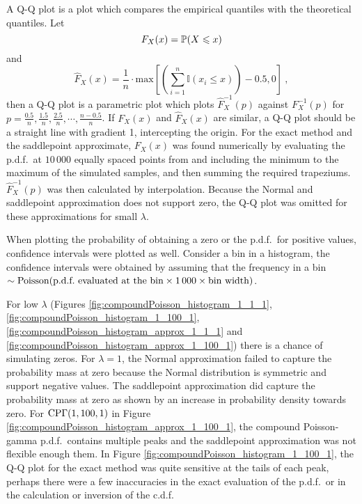 A Q-Q plot is a plot which compares the empirical quantiles with the theoretical quantiles. Let
\begin{equation}
  F_X(x) = \operatorname{\mathbb{P}}(X\leqslant x)
\end{equation}
and
\begin{equation}
  \widehat{F}_X(x) = \frac{1}{n}\cdot\text{max}
  \left[
    \left(\sum_{i=1}^n\mathbb{I}(x_i\leqslant x)\right)-0.5,0
  \right]
  \ ,
\end{equation}
then a Q-Q plot is a parametric plot which plots $\widehat{F}_X^{-1}(p)$ against $F_X^{-1}(p)$ for $p=\frac{0.5}{n},\frac{1.5}{n},\frac{2.5}{n},\cdots,\frac{n-0.5}{n}$. If $F_X(x)$ and $\widehat{F}_X(x)$ are similar, a Q-Q plot should be a straight line with gradient 1, intercepting the origin. For the exact method and the saddlepoint approximate, $F_X(x)$ was found numerically by evaluating the p.d.f.~at $10\,000$ equally spaced points from and including the minimum to the maximum of the simulated samples, and then summing the required trapeziums. $\widehat{F}_X^{-1}(p)$ was then calculated by interpolation. Because the Normal and saddlepoint approximation does not support zero, the Q-Q plot was omitted for these approximations for small $\lambda$.

When plotting the probability of obtaining a zero or the p.d.f.~for positive values, confidence intervals were plotted as well. Consider a bin in a histogram, the confidence intervals were obtained by assuming that the frequency in a bin $\sim\operatorname{Poisson}(\text{p.d.f.~evaluated at the bin}\times 1\,000 \times \text{bin width})$.

For low $\lambda$ (Figures \ref{fig:compoundPoisson_histogram_1_1_1}, \ref{fig:compoundPoisson_histogram_1_100_1}, \ref{fig:compoundPoisson_histogram_approx_1_1_1} and \ref{fig:compoundPoisson_histogram_approx_1_100_1}) there is a chance of simulating zeros. For $\lambda = 1$, the Normal approximation failed to capture the probability mass at zero because the Normal distribution is symmetric and support negative values. The saddlepoint approximation did capture the probability mass at zero as shown by an increase in probability density towards zero. For $\operatorname{CP\Gamma}(1,100,1)$ in Figure \ref{fig:compoundPoisson_histogram_approx_1_100_1}, the compound Poisson-gamma p.d.f.~contains multiple peaks and the saddlepoint approximation was not flexible enough them. In Figure \ref{fig:compoundPoisson_histogram_1_100_1}, the Q-Q plot for the exact method was quite sensitive at the tails of each peak, perhaps there were a few inaccuracies in the exact evaluation of the p.d.f.~or in the calculation or inversion of the c.d.f.


